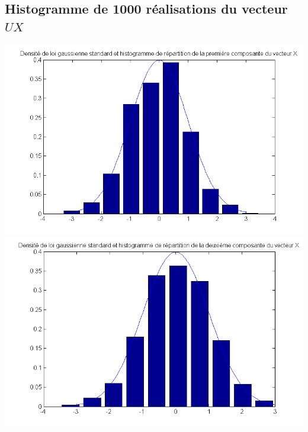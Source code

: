 \documentclass{report}
\begin{document}
		\subsection{Histogramme de 1000 réalisations du vecteur $UX$}
			\begin{center}
				\includegraphics[scale=0.7]{sources/Q223-1.png}
				\includegraphics[scale=0.7]{sources/Q223-2.png}
			\end{center}
\end{document}
